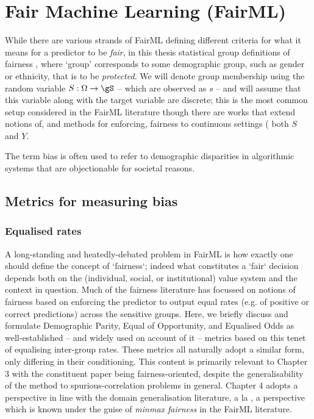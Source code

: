 \section{Fair Machine Learning (FairML)}\label{sec:fairml}
%
While there are various strands of FairML defining different criteria for what it means for a
predictor to be \emph{fair}, in this thesis statistical group definitions of fairness
\citep{barocas2019fairness}, where `group' corresponds to some demographic group, such as gender or
ethnicity, that is to be \emph{protected}.
%
We will denote group membership using the random variable \( S: \Omega \to \gS \) -- which are
observed as \(s\) -- and will assume that this variable along with the target variable are
discrete; this is the most common setup considered in the FairML literature though there are works
that extend notions of, and methods for enforcing, fairness to continuous settings (\wrt{} both
\(S\) and \(Y\).
%

The term bias is often used to refer to demographic disparities in algorithmic systems that are
objectionable for societal reasons.

\subsection{Metrics for measuring bias}\label{ssec:bias-metrics}
%
\subsubsection{Equalised rates}
%
A long-standing and heatedly-debated problem in FairML is how exactly one should define the concept
of `fairness`; indeed what constitutes a `fair` decision depends both on the (individual, social,
or institutional) value system and the context in question.
%
Much of the fairness literature has focussed on notions of fairness based on enforcing the
predictor to output equal rates (e.g. of positive or correct predictions) across the sensitive
groups.
%
Here, we briefly discuss and formulate Demographic Parity, Equal of Opportunity, and Equalised Odds
as well-established -- and widely used on account of it -- metrics based on this tenet of
equalising inter-group rates. These metrics all naturally adopt a similar form, only differing in
their conditioning. This content is primarily relevant to Chapter 3 with the constituent paper
being fairness-oriented, despite the generalisability of the method to spurious-correlation
problems in general. Chapter 4 adopts a perspective in line with the domain generalisation
literature, a la \cite{sagawa2019distributionally}, a perspective which is known under the guise of
\emph{minmax fairness} in the FairML literature.

